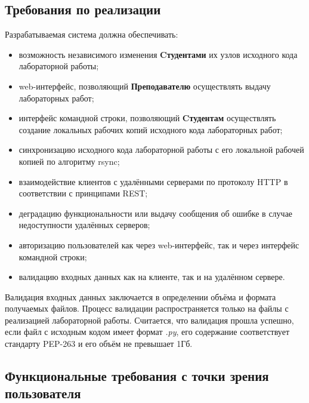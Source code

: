 \documentclass{bmstu}
\begin{document}
  \subsection{Требования по реализации}

  Разрабатываемая система должна обеспечивать:
  \begin{itemize}[label=---]
    \item возможность независимого изменения \textbf{Cтудентами} их узлов
      исходного кода лабораторной работы;
    \item web-интерфейс, позволяющий \textbf{Преподавателю} осуществлять выдачу
      лабораторных работ;
    \item интерфейс командной строки, позволяющий \textbf{Cтудентам}
      осуществлять создание локальных рабочих копий исходного кода
      лабораторных работ;
    \item синхронизацию исходного кода лабораторной работы с его локальной
      рабочей копией по алгоритму rsync;
    \item взаимодействие клиентов с удалёнными серверами по протоколу
      HTTP в соответствии с принципами REST;
    \item деградацию функциональности или выдачу сообщения об ошибке в
      случае недоступности удалённых серверов;
    \item авторизацию пользователей как через web-интерфейс, так и
      через интерфейс командной строки;
    \item валидацию входных данных как на клиенте, так и на удалённом
      сервере.
  \end{itemize}
  
  Валидация входных данных заключается в определении объёма и формата получаемых файлов.
  Процесс валидации распространяется только на файлы с реализацией лабораторной работы.
  Считается, что валидация прошла успешно, если файл с исходным кодом имеет формат \textit{.py}, его содержание соответствует стандарту PEP-263 и его объём не превышает 1Гб.

  \subsection{Функциональные требования с точки зрения пользователя}
\end{document}

